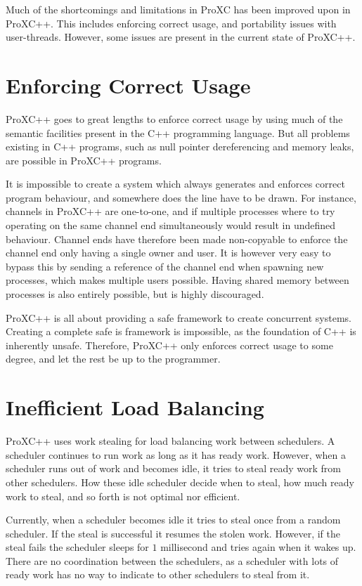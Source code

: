 Much of the shortcomings and limitations in ProXC has been improved upon in ProXC++. This includes enforcing correct usage, and portability issues with user\hyp{}threads. However, some issues are present in the current state of ProXC++.


\section{Enforcing Correct Usage}

ProXC++ goes to great lengths to enforce correct usage by using much of the semantic facilities present in the C++ programming language. But all problems existing in C++ programs, such as null pointer dereferencing and memory leaks, are possible in ProXC++ programs.  

It is impossible to create a system which always generates and enforces correct program behaviour, and somewhere does the line have to be drawn. For instance, channels in ProXC++ are one\hyp{}to\hyp{}one, and if multiple processes where to try operating on the same channel end simultaneously would result in undefined behaviour. Channel ends have therefore been made non\hyp{}copyable to enforce the channel end only having a single owner and user. It is however very easy to bypass this by sending a reference of the channel end when spawning new processes, which makes multiple users possible. Having shared memory between processes is also entirely possible, but is highly discouraged.

ProXC++ is all about providing a safe framework to create concurrent systems. Creating a complete safe is framework is impossible, as the foundation of C++ is inherently unsafe. Therefore, ProXC++ only enforces correct usage to some degree, and let the rest be up to the programmer.


\section{Inefficient Load Balancing}

ProXC++ uses work stealing for load balancing work between schedulers. A scheduler continues to run work as long as it has ready work. However, when a scheduler runs out of work and becomes idle, it tries to steal ready work from other schedulers. How these idle scheduler decide when to steal, how much ready work to steal, and so forth is not optimal nor efficient.

Currently, when a scheduler becomes idle it tries to steal once from a random scheduler. If the steal is successful it resumes the stolen work. However, if the steal fails the scheduler sleeps for $1$ millisecond and tries again when it wakes up. There are no coordination between the schedulers, as a scheduler with lots of ready work has no way to indicate to other schedulers to steal from it. 

